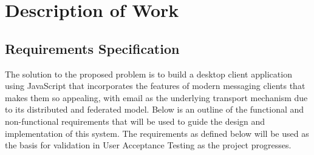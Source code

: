 \chapter{Description of Work}

\section{Requirements Specification}
The solution to the proposed problem is to build a desktop client application using JavaScript that incorporates the features of modern messaging clients that makes them so appealing, with email as the underlying transport mechanism due to its distributed and federated model. Below is an outline of the functional and non-functional requirements that will be used to guide the design and implementation of this system. The requirements as defined below will be used as the basis for validation in User Acceptance Testing as the project progresses.

